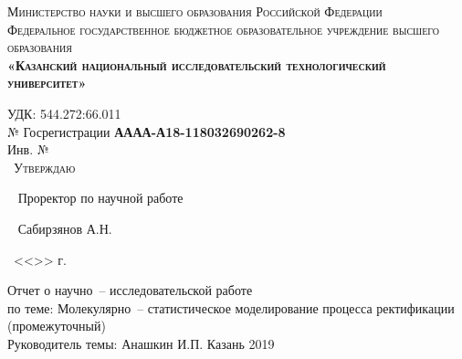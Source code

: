 \begin{center}
	\textsc{\large{Министерство науки и высшего образования Российской Федерации}\\
	\footnotesize{Федеральное государственное бюджетное образовательное учреждение высшего образования}\\ 
	\small{\textbf{«Казанский национальный исследовательский технологический университет»}}\\}
\end{center}

	\hfill \break
	\normalsize{УДК: 544.272:66.011}\\
	\normalsize{№ Госрегистрации \textbf{АААА-А18-118032690262-8}}\\
	\normalsize{Инв. №}\\
	
	\large
	~\hspace{9cm}\textsc{Утверждаю}
	
	~\hspace{7cm} Проректор по научной работе
	
	~\hspace{7cm}\underline{\hspace{3cm}} Сабирзянов А.Н.
	
	~\hspace{7cm}<<\underline{\hspace{1cm}}>> \underline{\hspace{4cm}} г.
	
	\hfill \break
\begin{center}
	\Large{Отчет о научно~-- исследовательской работе}\\
	\hfill \break
	\Large{по теме: Молекулярно~-- статистическое моделирование процесса ректификации\\(промежуточный)}\\
	\hfill \break
	\hfill \break
	\normalsize
	\large
Руководитель темы:\hspace{5cm}   \underline{\hspace{2.7cm}} Анашкин И.П.
\hfill \break
\vspace{8cm}
\hfill \break
 Казань 2019
\end{center}
\thispagestyle{empty} %


\newpage


